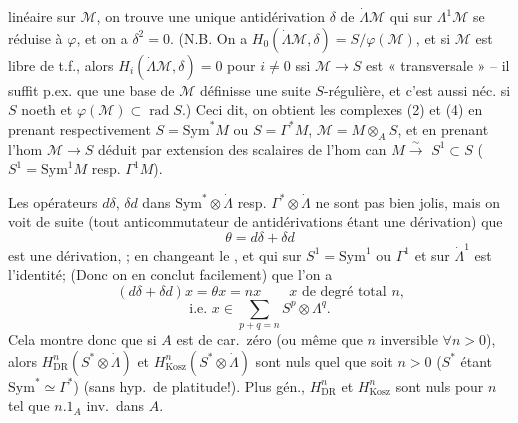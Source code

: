 \documentclass[11pt,a4paper]{article}
\begin{document}
linéaire sur $\mathcal{M}$, on trouve une unique antidérivation $\delta$ de
$\dot\Lambda\mathcal{M}$ qui sur $\Lambda^1\mathcal{M}$ se réduise à $\varphi$, et on
a $\delta^2 = 0$. (N.B. On a $H_0(\dot\Lambda\mathcal{M}, \delta) = S/\varphi(\mathcal{M})$, et
si $\mathcal{M}$ est libre de t.f., alors $H_i(\dot\Lambda\mathcal{M}, \delta) = 0$ pour $i \neq 0$
ssi $\mathcal{M} \to S$ est « transversale » -- il suffit p.ex. que une
base de $\mathcal{M}$ définisse une suite $S$-régulière,
et c'est aussi néc. si $S$ noeth et $\varphi(\mathcal{M}) \subset \operatorname{rad} S$.)
Ceci dit, on obtient les complexes (2) et (4)
en prenant respectivement $S = \mathrm{Sym}^*M$ ou $S = \Gamma^*M$,
$\mathcal{M} = M \otimes_A S$, et en prenant l'hom $\mathcal{M} \to S$
\struck{\ill{}} déduit par extension des scalaires de l'hom can
$M \xrightarrow{\sim}$  $S^1 \subset S$
\struck{\ill{}} ($S^1 = \mathrm{Sym}^1M$ resp. $\Gamma^1M$).

Les opérateurs $d\delta$, $\delta d$ dans $\mathrm{Sym}^*\otimes\dot\Lambda$ resp.
$\Gamma^*\otimes\dot\Lambda$ ne sont pas bien jolis, mais on voit de
suite (tout anticommutateur de antidérivations étant
une dérivation) que
\[ \theta = d\delta + \delta d \]
est une dérivation, ; en changeant \struck{\ill{}} le
 , et qui sur
$S^1 = \mathrm{Sym}^1$ ou $\Gamma^1$ 
et sur $\dot\Lambda^1$ est l'identité; (Donc on en conclut facilement)
que l'on a
\[ (d\delta + \delta d)x = \theta x = nx \qquad \text{$x$ de degré total $n$,} \]
\[ \text{i.e. } x \in \textstyle\sum_{p+q=n} S^p \otimes \Lambda^q . \]
Cela montre donc que si $A$ est de car.\ zéro (ou même que $n$
inversible $\forall n > 0$), alors $H^n_{\mathrm{DR}}(S^*\otimes\dot\Lambda)$ et $H^n_{\mathrm{Kosz}}(S^*\otimes\dot\Lambda)$
sont nuls quel que soit $n > 0$
($S^*$ étant $\mathrm{Sym}^* \simeq \Gamma^*$) (sans hyp.\ de platitude!). Plus gén., $H^n_{\mathrm{DR}}$ et $H^n_{\mathrm{Kosz}}$
sont nuls pour  $n$ tel que $n.1_A$ inv.\ dans $A$.
\end{document}
